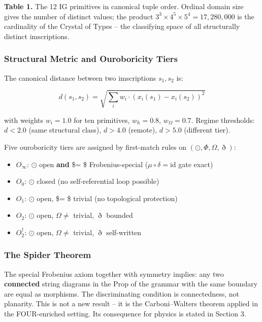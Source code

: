 \documentclass[12pt,a4paper]{article}
\begin{document}
\textbf{Table 1.} The 12 IG primitives in canonical tuple order. Ordinal
domain size gives the number of distinct values; the product
\(3^3 \times 4^5 \times 5^4 = 17{,}280{,}000\) is the cardinality of the
Crystal of Types -- the classifying space of all structurally distinct
imscriptions.

\hypertarget{structural-metric-and-ouroboricity-tiers}{%
\subsubsection{Structural Metric and Ouroboricity
Tiers}\label{structural-metric-and-ouroboricity-tiers}}

The canonical distance between two imscriptions \(s_1, s_2\) is:

\[d(s_1, s_2) = \sqrt{\sum_i w_i \cdot (x_i(s_1) - x_i(s_2))^2}\]

with weights \(w_i = 1.0\) for ten primitives, \(w_\hbar = 0.8\),
\(w_\Omega = 0.7\). Regime thresholds: \(d < 2.0\) (same structural
class), \(d > 4.0\) (remote), \(d > 5.0\) (different tier).

Five ouroboricity tiers are assigned by first-match rules on
\((\odot, \Phi, \Omega, \eth)\):

\begin{itemize}
\tightlist
\item
  \(O_\infty\): \(\odot\) open \textbf{and} \$\Phi = \$
  Frobenius-special (\(\mu \circ \delta = \mathrm{id}\) gate exact)
\item
  \(O_0\): \(\odot\) closed (no self-referential loop possible)
\item
  \(O_1\): \(\odot\) open, \$\Omega = \$ trivial (no topological
  protection)
\item
  \(O_2\): \(\odot\) open, \(\Omega \ne\) trivial, \(\eth\) bounded
\item
  \(O_2^\dagger\): \(\odot\) open, \(\Omega \ne\) trivial, \(\eth\)
  self-written
\end{itemize}

\hypertarget{the-spider-theorem}{%
\subsubsection{The Spider Theorem}\label{the-spider-theorem}}

The special Frobenius axiom together with symmetry implies: any two
\textbf{connected} string diagrams in the Prop of the grammar with the
same boundary are equal as morphisms. The discriminating condition is
connectedness, not planarity. This is not a new result -- it is the
Carboni--Walters theorem applied in the FOUR-enriched setting. Its
consequence for physics is stated in Section 3.
\end{document}
